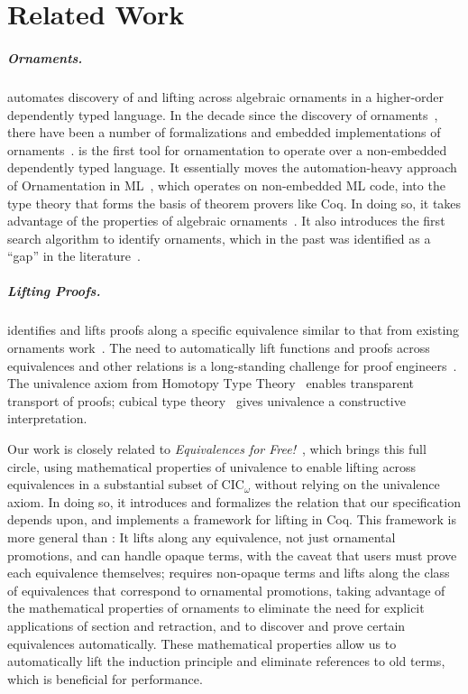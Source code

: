 \section{Related Work}
\label{sec:related}

\subparagraph*{Ornaments.}
\toolnameb automates discovery of and lifting across algebraic ornaments in a higher-order dependently typed language.
In the decade since the discovery of ornaments~\cite{mcbride}, there have been a number
of formalizations and embedded implementations of ornaments~\cite{Dagand:2013:CTO:2591370.2591396, ko2013relational, dagand2014transporting, ko2016programming, dagand2017essence}.
\toolnameb is the first tool for ornamentation to operate over a non-embedded dependently typed language.
It essentially moves the automation-heavy approach of Ornamentation in ML~\cite{Williams2017},
which operates on non-embedded ML code, into the type theory that forms the basis of theorem provers like Coq. 
In doing so, it takes advantage of the properties of algebraic ornaments~\cite{mcbride}.
It also introduces the first search algorithm to identify ornaments, which in the past 
was identified as a ``gap'' in the literature~\cite{ko2016programming}.

\subparagraph*{Lifting Proofs.}
\toolnameb identifies and lifts proofs along a specific equivalence 
similar to that from existing ornaments work~\cite{ko2016programming}.
The need to automatically lift functions and proofs
across equivalences and other relations is a long-standing challenge for proof 
engineers~\cite{magaud2000changing, barthe2001type, magaud2003changing, huffman2013lifting, zimmermann2015automatic, cohen:hal-01414881}.
The univalence axiom from Homotopy Type Theory~\cite{univalent2013homotopy} enables transparent transport of proofs;
cubical type theory~\cite{cohen2016cubical} gives univalence a constructive interpretation. 

Our work is closely related to \textit{Equivalences for Free!}~\cite{tabareau2017equivalences}, which brings this full circle, 
using mathematical properties of univalence to enable lifting across equivalences in a substantial subset of CIC$_\omega$ without relying
on the univalence axiom. In doing so, it introduces and formalizes the relation that our specification depends upon,
and implements a framework for lifting in Coq. This framework is more general than \toolnameb: It lifts along any equivalence, not
just ornamental promotions, and can handle opaque terms,
with the caveat that users must prove each equivalence themselves; \toolnameb requires non-opaque terms and lifts along the class of equivalences that correspond
to ornamental promotions, taking advantage of the mathematical properties of ornaments to eliminate the need for explicit applications of section
and retraction, and to discover and prove certain equivalences automatically. These mathematical properties
allow us to automatically
lift the induction principle and eliminate references to old terms,
which is beneficial for performance.

